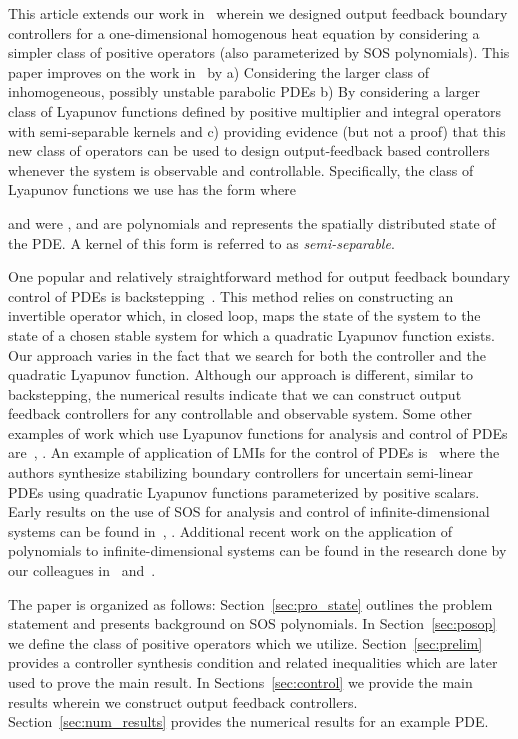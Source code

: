\documentclass[US letter, 9 pt, conference]{ieeeconf}  \usepackage{setspace}
\begin{document}
This article extends our work in~\cite{gahlawat2011designing} wherein we designed output feedback boundary controllers for a one-dimensional homogenous heat equation by considering a simpler class of positive operators (also parameterized by SOS polynomials). This paper improves on the work in~\cite{gahlawat2011designing} by a) Considering the larger class of inhomogeneous, possibly unstable parabolic PDEs b) By considering a larger class of Lyapunov functions defined by positive multiplier and integral operators with semi-separable kernels and c) providing evidence (but not a proof) that this new class of operators can be used to design output-feedback based controllers whenever the system is observable and controllable. Specifically, the class of Lyapunov functions we use has the form
 where

and were ,  and  are polynomials and  represents the spatially distributed state of the PDE. A kernel  of this form is referred to as \textit{semi-separable}.

One popular and relatively straightforward method for output feedback boundary control of PDEs is backstepping~\cite{krstic2008boundary}. This method relies on constructing an invertible operator which, in closed loop, maps the state of the system to the state of a chosen stable system for which a quadratic Lyapunov function exists. Our approach varies in the fact that we search for both the controller and the quadratic Lyapunov function. Although our approach is different, similar to backstepping, the numerical results indicate that we can construct output feedback controllers for any controllable and observable system. Some other examples of work which use Lyapunov functions for analysis and control of PDEs are~\cite{coron2008dissipative}, \cite{coron2007strict}. An example of application of LMIs for the control of PDEs is~\cite{fridman2009lmi} where the authors synthesize stabilizing boundary controllers for uncertain semi-linear PDEs using quadratic Lyapunov functions parameterized by positive scalars. Early results on the use of SOS for analysis and control of infinite-dimensional systems can be found in~\cite{peet2006positive}, \cite{papachristodoulou2006analysis}. Additional recent work on the application of polynomials to infinite-dimensional systems can be found in the research done by our colleagues in~\cite{Valmo_1} and~\cite{Valmo_2}.

The paper is organized as follows: Section~\ref{sec:pro_state} outlines the problem statement and presents background on SOS polynomials. In Section~\ref{sec:posop} we define the class of positive operators which we utilize. Section~\ref{sec:prelim} provides a controller synthesis condition and related inequalities which are later used to prove the main result. In Sections~\ref{sec:control} we provide the main results wherein we construct output feedback controllers. Section~\ref{sec:num_results} provides the numerical results for an example PDE.
\end{document}

